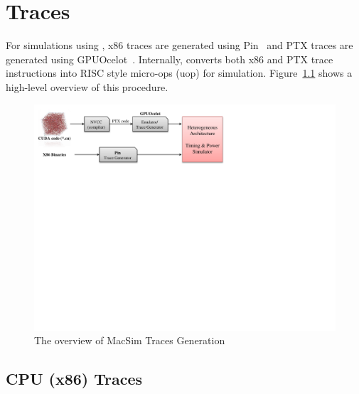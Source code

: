 \chapter{Traces}
\label{ch:trace}

For simulations using \SIM, x86 traces are generated using Pin~\cite{pin} and
PTX traces are generated using GPUOcelot~\cite{ocelot}. Internally, \SIM
converts both x86 and PTX trace instructions into RISC style micro-ops (uop)
for simulation. Figure~\ref{fig:overview} shows a high-level overview of
this procedure. 

\begin{figure}[htb]
\centering \includegraphics{figs/macsim_overview}
\caption{The overview of MacSim Traces Generation}
\label{fig:overview}
\end{figure}





\section{CPU (x86) Traces}

